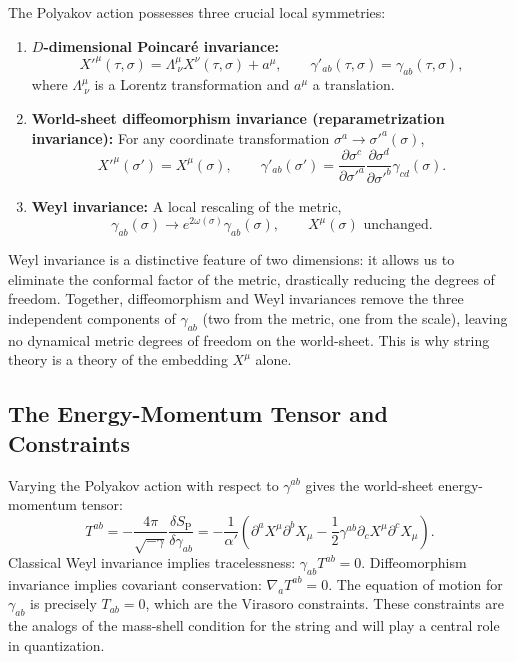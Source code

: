 \documentclass[11pt]{article}
\begin{document}
The Polyakov action possesses three crucial local symmetries:

\begin{enumerate}
\item \textbf{$D$-dimensional Poincaré invariance:}
\begin{equation}
X'^\mu(\tau,\sigma) = \Lambda^\mu_{\ \nu} X^\nu(\tau,\sigma) + a^\mu, \qquad \gamma'_{ab}(\tau,\sigma) = \gamma_{ab}(\tau,\sigma),
\end{equation}
where $\Lambda^\mu_{\ \nu}$ is a Lorentz transformation and $a^\mu$ a translation.
\item \textbf{World-sheet diffeomorphism invariance (reparametrization invariance):} For any coordinate transformation $\sigma^a \to \sigma'^a(\sigma)$,
\begin{equation}
X'^\mu(\sigma') = X^\mu(\sigma), \qquad \gamma'_{ab}(\sigma') = \frac{\partial \sigma^c}{\partial \sigma'^a}\frac{\partial \sigma^d}{\partial \sigma'^b} \gamma_{cd}(\sigma).
\end{equation}
\item \textbf{Weyl invariance:} A local rescaling of the metric,
\begin{equation}
\gamma_{ab}(\sigma) \to e^{2\omega(\sigma)} \gamma_{ab}(\sigma), \qquad X^\mu(\sigma) \text{ unchanged}.
\end{equation}
\end{enumerate}

Weyl invariance is a distinctive feature of two dimensions: it allows us to eliminate the conformal factor of the metric, drastically reducing the degrees of freedom. Together, diffeomorphism and Weyl invariances remove the three independent components of $\gamma_{ab}$ (two from the metric, one from the scale), leaving no dynamical metric degrees of freedom on the world-sheet. This is why string theory is a theory of the embedding $X^\mu$ alone.

\subsection{The Energy-Momentum Tensor and Constraints}

Varying the Polyakov action with respect to $\gamma^{ab}$ gives the world-sheet energy-momentum tensor:
\begin{equation}
T^{ab} = -\frac{4\pi}{\sqrt{-\gamma}} \frac{\delta S_{\mathrm{P}}}{\delta \gamma_{ab}} = -\frac{1}{\alpha'} \left( \partial^a X^\mu \partial^b X_\mu - \frac{1}{2} \gamma^{ab} \partial_c X^\mu \partial^c X_\mu \right).
\end{equation}
Classical Weyl invariance implies tracelessness: $\gamma_{ab} T^{ab} = 0$. Diffeomorphism invariance implies covariant conservation: $\nabla_a T^{ab} = 0$. The equation of motion for $\gamma_{ab}$ is precisely $T_{ab}=0$, which are the Virasoro constraints. These constraints are the analogs of the mass-shell condition for the string and will play a central role in quantization.
\end{document}

